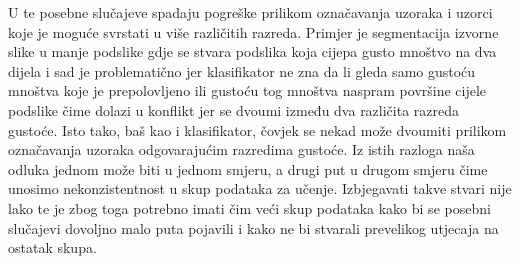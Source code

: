 \documentclass[times, utf8, zavrsni, numeric]{fer}
\begin{document}
\bigbreak

U te posebne slučajeve
spadaju pogreške prilikom označavanja uzoraka i uzorci koje je moguće svrstati u više različitih razreda. Primjer je
segmentacija izvorne slike u manje podslike gdje se stvara podslika koja cijepa gusto mnoštvo na dva dijela
i sad je problematično jer klasifikator ne zna da li gleda samo gustoću mnoštva koje je prepolovljeno ili gustoću 
tog mnoštva naspram površine cijele podslike čime dolazi u konflikt jer se dvoumi između dva različita razreda gustoće.
Isto tako, baš kao i klasifikator, čovjek se nekad može dvoumiti prilikom označavanja uzoraka
odgovarajućim razredima gustoće. Iz istih razloga naša odluka jednom može biti u jednom smjeru, a 
drugi put u drugom smjeru čime unosimo nekonzistentnost u skup podataka za učenje. Izbjegavati takve
stvari nije lako te je zbog toga potrebno imati čim veći skup podataka kako bi se posebni slučajevi
dovoljno malo puta pojavili i kako ne bi stvarali prevelikog utjecaja na ostatak skupa. 
\end{document}
